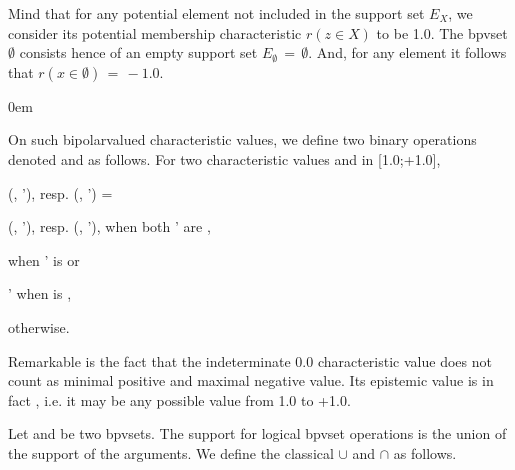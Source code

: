 \documentclass[a4paper,12pt,english]{sphinxhowto}
\begin{document}
\sphinxAtStartPar
Mind that for any potential element  not included in the support set \(E_X\), we consider its potential  membership characteristic \(r(z \in X)\) to be \sphinxhyphen{}1.0. The  bpv\sphinxhyphen{}set \(\emptyset\) consists hence of an empty support set \(E_{\emptyset} \,=\, \emptyset\). And, for any element  it follows that \(r(x \in \emptyset) \,=\, -1.0\).

\begin{DUlineblock}{0em}
\item[] On such bipolar\sphinxhyphen{}valued characteristic values, we define two binary operations denoted  and  as follows. For two characteristic values  and  in {[}\sphinxhyphen{}1.0;+1.0{]},
\item[]  (, ’), resp.  (, ’) =
\item[]
\begin{DUlineblock}{\DUlineblockindent}
\item[]  (, ’), resp.  (, ’), when both   ’ are ,
\item[]   when ’ is  or
\item[] ’ when  is ,
\item[]  otherwise. %
\begin{footnote}[34]\sphinxAtStartFootnote
Remarkable is the fact that the indeterminate 0.0 characteristic value does not count as minimal positive and maximal negative value. Its epistemic value is in fact , i.e. it may be any possible value from \sphinxhyphen{}1.0 to +1.0.
%
\end{footnote}
\end{DUlineblock}
\end{DUlineblock}

\sphinxAtStartPar
Let  and  be two bpv\sphinxhyphen{}sets. The support for logical bpv\sphinxhyphen{}set operations is the union of the support of the arguments. We define the classical  \(\cup\) and  \(\cap\) as follows.
\end{document}
